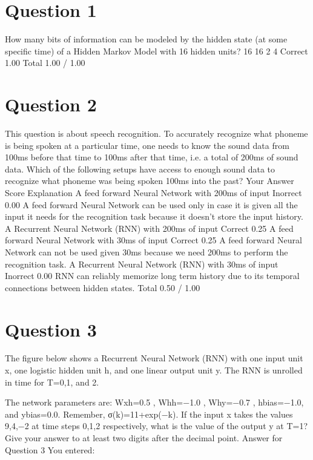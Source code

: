 \newpage
\section*{Question 1}
How many bits of information can be modeled by the hidden state (at some specific time) of a Hidden Markov Model with 16 hidden units?
16			
16			
2			
4	Correct	1.00	
Total		1.00 / 1.00	
\newpage
\section*{Question 2}
This question is about speech recognition. To accurately recognize what phoneme is being spoken at a particular time, one needs to know the sound data from 100ms before that time to 100ms after that time, i.e. a total of 200ms of sound data. Which of the following setups have access to enough sound data to recognize what phoneme was being spoken 100ms into the past?
Your Answer		Score	Explanation
A feed forward Neural Network with 200ms of input	Inorrect	0.00	A feed forward Neural Network can be used only in case it is given all the input it needs for the recognition task because it doesn't store the input history.
A Recurrent Neural Network (RNN) with 200ms of input	Correct	0.25	
A feed forward Neural Network with 30ms of input	Correct	0.25	A feed forward Neural Network can not be used given 30ms because we need 200ms to perform the recognition task.
A Recurrent Neural Network (RNN) with 30ms of input	Inorrect	0.00	RNN can reliably memorize long term history due to its temporal connections between hidden states.
Total		0.50 / 1.00	
\newpage
\section*{Question 3}
The figure below shows a Recurrent Neural Network (RNN) with one input unit x, one logistic hidden unit h, and one linear output unit y. The RNN is unrolled in time for T=0,1, and 2. 



The network parameters are: Wxh=0.5 , Whh=−1.0 , Why=−0.7 , hbias=−1.0, and ybias=0.0. Remember, σ(k)=11+exp(−k). 
If the input x takes the values 9,4,−2 at time steps 0,1,2 respectively, what is the value of the output y at T=1? Give your answer to at least two digits after the decimal point.
Answer for Question 3
You entered:

